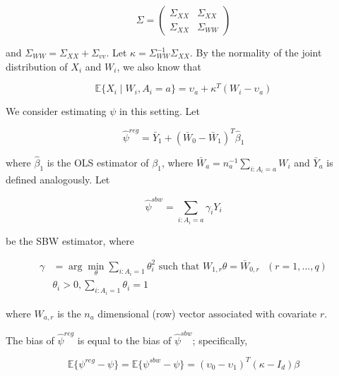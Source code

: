 $$
\Sigma = \begin{pmatrix} 
\Sigma_{XX} & \Sigma_{XX} \\ 
\Sigma_{XX} & \Sigma_{WW}  
\end{pmatrix}
$$ 

and $\Sigma_{WW} = \Sigma_{XX} + \Sigma_{vv}$. Let $\kappa = \Sigma_{WW}^{-1}\Sigma_{XX}$. By the normality of the joint distribution of $X_i$ and $W_i$, we also know that

\begin{equation}
\mathbb{E}\{X_i \mid W_i, A_i = a\} = \upsilon_a + \kappa^T(W_i - \upsilon_a)
\end{equation}

We consider estimating $\psi$ in this setting. Let 

$$
\hat{\psi}^{reg} = \bar{Y}_1 + (\bar{W}_0 - \bar{W}_1)^T\hat{\beta}_1
$$ 

where $\hat{\beta}_1$ is the OLS estimator of $\beta_1$, where $\bar{W}_a = n_a^{-1}\sum_{i:A_i = a} W_i$ and $\bar{Y}_a$ is defined analogously. Let 

$$
\hat{\psi}^{sbw} = \sum_{i: A_i = a} \gamma_i Y_i
$$ 

be the SBW estimator, where

\begin{align*}
\gamma &= \arg\min_{\theta} \sum_{i: A_i = 1}\theta_i^2 \text{ such that } W_{1, r}\theta = \bar{W}_{0, r} \ \ \ (r = 1, ..., q) \\
&\theta_i > 0, \sum_{i: A_i = 1}\theta_i = 1
\end{align*}

where $W_{a, r}$ is the $n_a$ dimensional (row) vector associated with covariate $r$.

\begin{proposition}\label{cl1}
The bias of $\hat{\psi}^{reg}$ is equal to the bias of $\hat{\psi}^{sbw}$; specifically, 

$$
\mathbb{E}\{\psi^{reg} - \psi\} = \mathbb{E}\{\psi^{sbw} - \psi\} = (\upsilon_0 - \upsilon_1)^T(\kappa - I_d)\beta
$$
\end{proposition}

